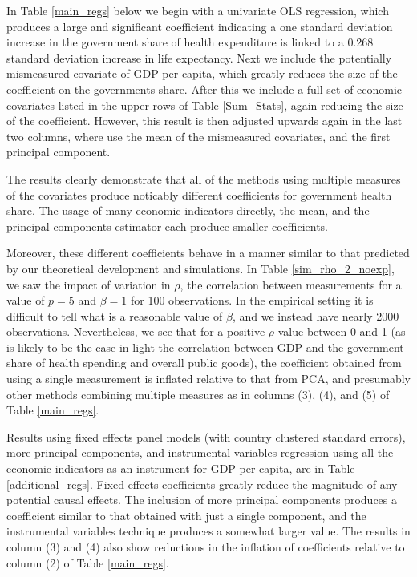 \documentclass[10pt]{article}
\begin{document}
        In Table \ref{main_regs} below we begin with a univariate OLS regression, which produces a large and significant coefficient indicating a one standard deviation increase in the government share of health expenditure is linked to a 0.268 standard deviation increase in life expectancy. Next we include the potentially mismeasured covariate of GDP per capita, which greatly reduces the size of the coefficient on the governments share. After this we include a full set of economic covariates listed in the upper rows of Table \ref{Sum_Stats}, again reducing the size of the coefficient. However, this result is then adjusted upwards again in the last two columns, where use the mean of the mismeasured covariates, and the first principal component.

        
        
        

        The results clearly demonstrate that all of the methods using multiple measures of the covariates produce noticably different coefficients for government health share. The usage of many economic indicators directly, the mean, and the principal components estimator each produce smaller coefficients.

        Moreover, these different coefficients behave in a manner similar to that predicted by our theoretical development and simulations. In Table \ref{sim_rho_2_noexp}, we saw the impact of variation in $\rho$, the correlation between measurements for a value of $p = 5$ and $\beta = 1$ for 100 observations. In the empirical setting it is difficult to tell what is a reasonable value of $\beta$, and we instead have nearly 2000 observations. Nevertheless, we see that for a positive $\rho$ value between 0 and 1 (as is likely to be the case in light the correlation between GDP and the government share of health spending and overall public goods), the coefficient obtained from using a single measurement is inflated relative to that from PCA, and presumably other methods combining multiple measures as in columns (3), (4), and (5) of Table \ref{main_regs}.

        Results using fixed effects panel models (with country clustered standard errors), more principal components, and instrumental variables regression using all the economic indicators as an instrument for GDP per capita, are in Table \ref{additional_regs}. Fixed effects coefficients greatly reduce the magnitude of any potential causal effects. The inclusion of more principal components produces a coefficient similar to that obtained with just a single component, and the instrumental variables technique produces a somewhat larger value. The results in column (3) and (4) also show reductions in the inflation of coefficients relative to column (2) of Table \ref{main_regs}.
\end{document}
